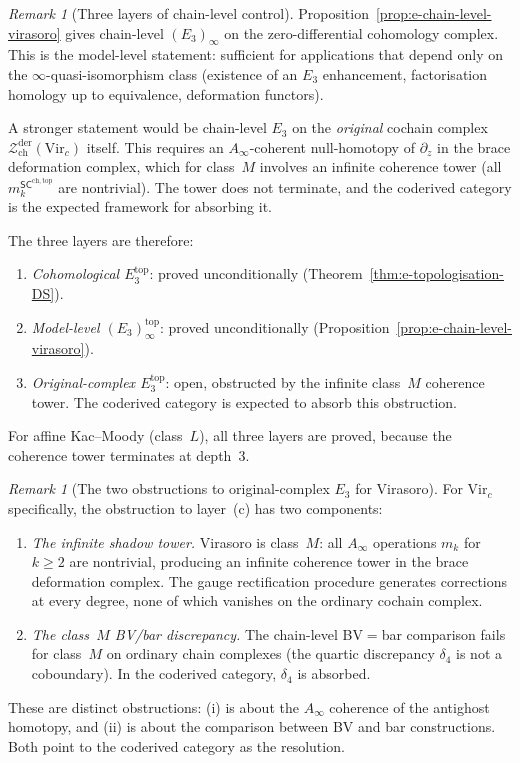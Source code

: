 \documentclass[11pt,reqno]{amsart}
\theoremstyle{definition}
\theoremstyle{remark}
\newtheorem{remark}[theorem]{Remark}
\providecommand{\cZ}{\mathcal{Z}}
\providecommand{\Ainf}{A_\infty}
\providecommand{\Ethree}{E_3}
\providecommand{\SCchtop}{\ensuremath{\mathsf{SC}^{\mathrm{ch,top}}}}
\begin{document}
\begin{remark}[Three layers of chain-level control]
\label{rem:e-three-layers}
Proposition~\ref{prop:e-chain-level-virasoro} gives
chain-level $(\Ethree)_\infty$ on the zero-differential
cohomology complex. This is the model-level statement:
sufficient for applications that depend only on the
$\infty$-quasi-isomorphism class (existence of an
$\Ethree$ enhancement, factorisation homology up to
equivalence, deformation functors).

A stronger statement would be chain-level $\Ethree$ on the
\emph{original} cochain complex
$\cZ^{\mathrm{der}}_{\mathrm{ch}}(\mathrm{Vir}_c)$ itself.
This requires an $\Ainf$-coherent null-homotopy of
$\partial_z$ in the brace deformation complex, which for
class~$M$ involves an infinite coherence tower (all
$m_k^{\SCchtop}$ are nontrivial). The tower does not
terminate, and the coderived category is the expected
framework for absorbing it.

The three layers are therefore:
\begin{enumerate}[label=\textup{(\alph*)}]
\item \emph{Cohomological $\Ethree^{\mathrm{top}}$}:
 proved unconditionally
 \textup{(}Theorem~\ref{thm:e-topologisation-DS}\textup{)}.
\item \emph{Model-level $(\Ethree)_\infty^{\mathrm{top}}$}:
 proved unconditionally
 \textup{(}Proposition~\ref{prop:e-chain-level-virasoro}\textup{)}.
\item \emph{Original-complex $\Ethree^{\mathrm{top}}$}:
 open, obstructed by the infinite class~$M$ coherence tower.
 The coderived category is expected to absorb this obstruction.
\end{enumerate}
For affine Kac--Moody (class~$L$), all three layers are proved,
because the coherence tower terminates at depth~$3$.
\end{remark}

\begin{remark}[The two obstructions to original-complex $\Ethree$
for Virasoro]
\label{rem:e-virasoro-two-obstructions}
For $\mathrm{Vir}_c$ specifically, the obstruction to
layer~(c) has two components:
\begin{enumerate}[label=\textup{(\roman*)}]
\item \emph{The infinite shadow tower.}
 Virasoro is class~$M$: all $\Ainf$ operations $m_k$ for
 $k \geq 2$ are nontrivial, producing an infinite coherence
 tower in the brace deformation complex. The gauge
 rectification procedure generates corrections at every
 degree, none of which vanishes on the ordinary
 cochain complex.
\item \emph{The class~$M$ BV/bar discrepancy.}
 The chain-level BV${}={}$bar comparison fails for class~$M$
 on ordinary chain complexes (the quartic discrepancy
 $\delta_4$ is not a coboundary). In the coderived category,
 $\delta_4$ is absorbed.
\end{enumerate}
These are distinct obstructions: (i) is about the $\Ainf$
coherence of the antighost homotopy, and (ii) is about the
comparison between BV and bar constructions. Both point
to the coderived category as the resolution.
\end{remark}
\end{document}
